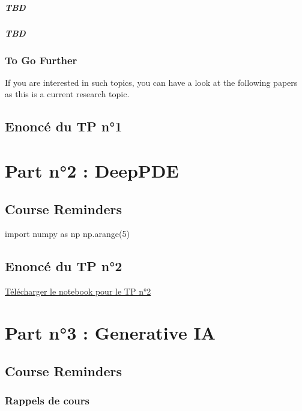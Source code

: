 \documentclass[
  10,
  letterpaper,
  DIV=11,
  numbers=noendperiod]{scrreport}
\theoremstyle{definition}
\theoremstyle{definition}
\theoremstyle{plain}
\theoremstyle{remark}
\begin{document}
\subsubsection{TBD}\label{tbd-1}

\subsubsection{TBD}\label{tbd-2}

\section{To Go Further}\label{to-go-further}

If you are interested in such topics, you can have a look at the
following papers as this is a current research topic.

\chapter{Enoncé du TP n°1}\label{enoncuxe9-du-tp-n1}

\part{Part n°2 : DeepPDE}

\chapter{Course Reminders}\label{course-reminders-1}

import numpy as np np.arange(5)

\chapter{Enoncé du TP n°2}\label{enoncuxe9-du-tp-n2}

\href{ProjetXVA.ipynb}{Télécharger le notebook pour le TP n°2}

\part{Part n°3 : Generative IA}

\chapter{Course Reminders}\label{course-reminders-2}

\section{Rappels de cours}\label{rappels-de-cours}
\end{document}
